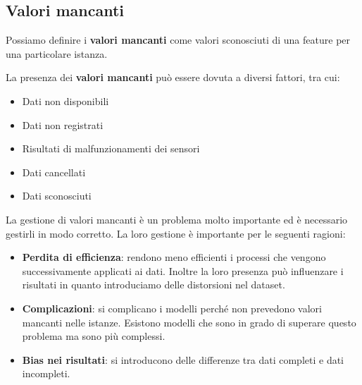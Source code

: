 \subsection{Valori mancanti}
\begin{definizione} 
    Possiamo definire i \textbf{valori mancanti} come valori sconosciuti di una
    feature per una particolare istanza.
\end{definizione}
La presenza dei \textbf{valori mancanti} può essere dovuta a diversi fattori,
tra cui:
\begin{itemize}
    \item Dati non disponibili
    \item Dati non registrati
    \item Risultati di malfunzionamenti dei sensori
    \item Dati cancellati
    \item Dati sconosciuti
\end{itemize}
La gestione di valori mancanti è un problema molto importante ed è necessario
gestirli in modo corretto. La loro gestione è importante per le seguenti ragioni:
\begin{itemize}
    \item \textbf{Perdita di efficienza}: rendono meno efficienti i processi che
          vengono successivamente applicati ai dati. Inoltre la loro presenza può
          influenzare i risultati in quanto introduciamo delle distorsioni nel
          dataset.
    \item \textbf{Complicazioni}: si complicano i modelli perché non prevedono
          valori mancanti nelle istanze. Esistono modelli che sono in grado di
          superare questo problema ma sono più complessi.
    \item \textbf{Bias nei risultati}: si introducono delle differenze tra dati
          completi e dati incompleti.
\end{itemize}

